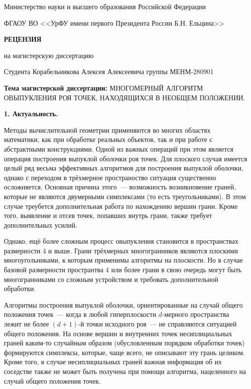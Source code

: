 \documentclass[12pt]{article}
\begin{document}
\begin{center}

Министерство науки и высшего образования Российской Федерации

\smallskip

ФГАОУ ВО <<УрФУ имени первого Президента России Б.Н. Ельцина>>

\medskip

\large

\textbf{РЕЦЕНЗИЯ}

на магистерскую диссертацию

Студента Корабельникова Алексея Алексеевича группы МЕНМ-280901
 
\medskip

\normalsize

\raggedright

\noindent
\textbf{Тема магистерской диссертации:} МНОГОМЕРНЫЙ АЛГОРИТМ ОВЫПУКЛЕНИЯ РОЯ ТОЧЕК, НАХОДЯЩИХСЯ В НЕОБЩЕМ ПОЛОЖЕНИИ.
\end{center}

\noindent
\textbf{1. Актуальность.}

\smallskip

Методы вычислительной геометрии применяются во многих областях математики, как при обработке реальных объектов, так и при работе с абстрактными конструкциями. Одной из важных операций при этом является операция построения выпуклой оболочки роя точек. Для плоского случая имеется целый ряд весьма эффективных алгоритмов для построения выпуклой оболочки, однако с переходом в трёхмерное пространоство ситуация существенно осложняется. Основная причина этого~--- возможность возникновение граней, которые не являются двумерными симплексами (то есть треугольниками). В этом случае треубется дополнительная работа по нахождению вершин грани. Кроме того, выявление и отсев точек, попавших внутрь грани, также требует дополнительных усилий. 

Однако, ещё более сложным процесс овыпукления становится в пространствах размерности 4 и выше. Грани трёхмерных многогранников являются плоскими многоугольниками, к которым применимы алгоритмы на плоскости. Но в случае базовой размерности пространтва 4 или более грани в свою очередь могут быть многогранниками со сложным устройством и требовать дополнительной обработки. 

Алгоритмы построения выпуклой оболочки, ориентированные на случай общего положения точек~--- когда в любой гиперплоскости $d$-мерного пространства лежит не более $(d+1)$-й точки исходного роя~--- не справляются ситуацией общего положения. На основе вершин и внутренних точек несиплициальных граней каким-то случайным образом (обусловленным порядком обработки точек) формируются симплексы, которые, чаще всего, не описывают эту грань целиком. Кроме того, в случае несиплициальных граней важная информация об их соседстве также не может быть получена при помощи алгоритма, нацеленного на случай общего положения точек.
\end{document}
